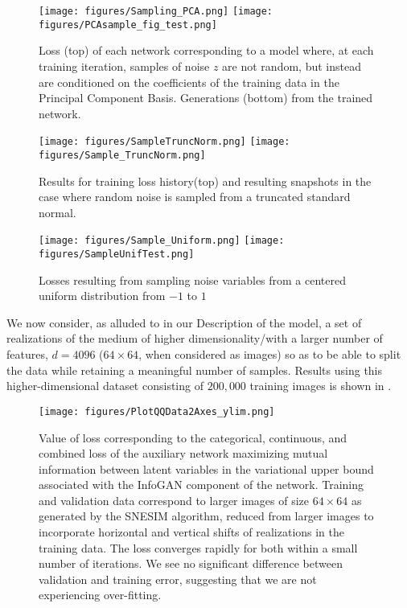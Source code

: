 \documentclass{article}
\begin{document}
\begin{figure}[h]
  \texttt{[image: figures/Sampling\_PCA.png]}
  \texttt{[image: figures/PCAsample\_fig\_test.png]}
  \caption{Loss (top) of each network corresponding to a model where, at each training iteration, samples of noise $z$ are not random, but instead are conditioned on the coefficients of the training data in the Principal Component Basis.  Generations (bottom) from the trained network.}
\end{figure}\label{zPCA}

\begin{figure}[h]
\texttt{[image: figures/SampleTruncNorm.png]}
\texttt{[image: figures/Sample\_TruncNorm.png]}
  \caption{Results for training loss history(top) and resulting snapshots in the case where random noise is sampled from a truncated standard normal.  }
\end{figure}\label{tnorm}


\begin{figure}[h]
\texttt{[image: figures/Sample\_Uniform.png]}
\texttt{[image: figures/SampleUnifTest.png]}
  \caption{Losses resulting from sampling noise variables from a centered uniform distribution from $-1$ to $1$ }
\end{figure}

We now consider, as alluded to in our Description of the model, a set of realizations of the medium of higher dimensionality/with a larger number of features, $d=4096$ ($64\times64$, when considered as images) so as to be able to split the data while retaining a meaningful number of samples.  Results using this higher-dimensional dataset consisting of $200,000$ training images is shown in \label{GenPCA2}.  

\begin{figure}[h]
  \texttt{[image: figures/PlotQQData2Axes\_ylim.png]}
  \caption{Value of loss corresponding to the categorical, continuous, and combined loss of the auxiliary network maximizing mutual information between latent variables in the variational upper bound associated with the InfoGAN component of the network. Training and validation data correspond to larger images of size $64 \times 64$ as generated by the SNESIM algorithm, reduced from larger images to incorporate horizontal and vertical shifts of realizations in the training data.  The loss converges rapidly for both within a small number of iterations.  We see no significant difference between validation and training error, suggesting that we are not experiencing over-fitting.}
\end{figure}\label{GenPCA2}
\end{document}
